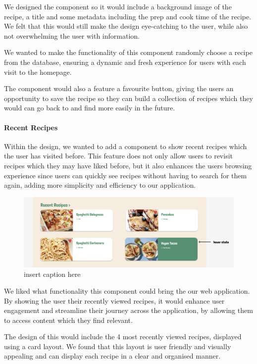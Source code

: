 \documentclass{article}
\begin{document}
We designed the component so it would include a background image of the recipe, a title and some metadata including the prep and cook time of the recipe. We felt that this would still make the design eye-catching to the user, while also not overwhelming the user with information.

We wanted to make the functionality of this component randomly choose a recipe from the database, ensuring a dynamic and fresh experience for users with each visit to the homepage.

The component would also a feature a favourite button, giving the users an opportunity to save the recipe so they can build a collection of recipes which they would can go back to and find more easily in the future. 

\paragraph{Recent Recipes}  
Within the design, we wanted to add a component to show recent recipes which the user has visited before. This feature does not only allow users to revisit recipes which they may have liked before, but it also enhances the users browsing experience since users can quickly see recipes without having to search for them again, adding more simplicity and efficiency to our application.

\begin{figure}[htbp]
  \includegraphics[width=1.0\textwidth]{assets/Version 1 Recent Recipes.png}
  \centering
  \caption{insert caption here}
\end{figure}

We liked what functionality this component could bring the our web application. By showing the user their recently viewed recipes, it would enhance user engagement and streamline their journey across the application, by allowing them to access content which they find relevant.

The design of this would include the 4 most recently viewed recipes, displayed using a card layout. We found that this layout is user friendly and visually appealing and can display each recipe in a clear and organised manner. 
\end{document}
